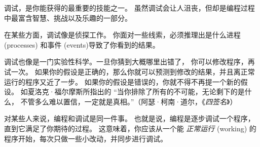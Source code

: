 
调试，是你能获得的最重要的技能之一。
虽然调试会让人沮丧，但却是编程过程中最富含智慧、挑战以及乐趣的一部分。
  


在某些方面，调试像是侦探工作。
你面对一些线索，必须推理出是什么进程 (processes) 和事件 (events)导致了你看到的结果。


调试也像是一门实验性科学。一旦你猜到大概哪里出错了，
你可以修改程序，再试一次。
如果你的假设是正确的，那么你就可以预测到修改的结果，并且离正常运行的程序又近了一步。
如果你的假设是错误的，你就不得不再提一个新的假设。
如夏洛克·福尔摩斯所指出的 ``当你排除了所有的不可能，无论剩下的是什么，
不管多么难以置信，一定就是真相。''（阿瑟·柯南·道尔，《{\em 四签名}》）
  


对某些人来说，编程和调试是同一件事。
也就是说，编程是逐步调试一个程序，直到它满足了你期待的过程。
这意味着，你应该从一个能 {\em 正常运行} (working) 的程序开始，每次只做一些小改动，并同步进行调试。


